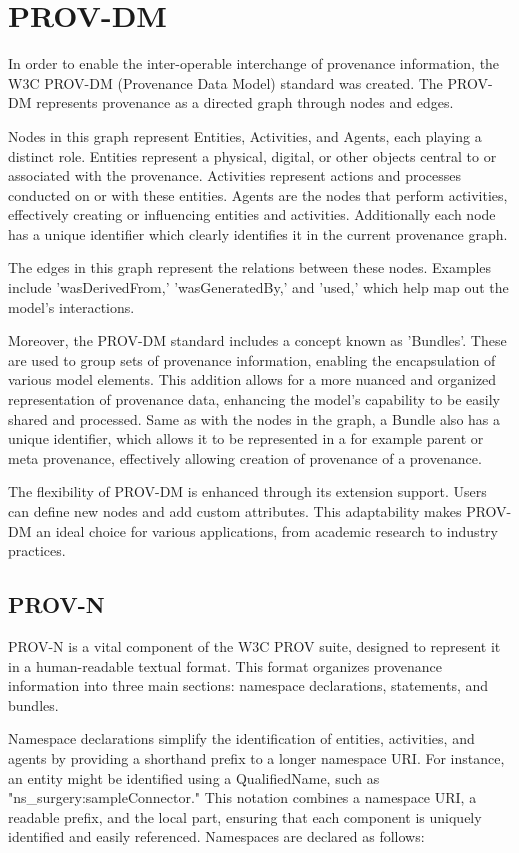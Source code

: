 \documentclass[
  digital,     %
  oneside,     %
  nosansbold,  %
  nocolorbold, %
  lof,         %
  lot,         %
]{fithesis4}
\begin{document}
\section{PROV-DM} \label{provdm}
\shorthandoff{-}
In order to enable the inter-operable interchange of provenance information, the W3C PROV-DM (Provenance Data Model) standard was created. The PROV-DM represents provenance as a directed graph through nodes and edges. 

Nodes in this graph represent Entities, Activities, and Agents, each playing a distinct role. Entities represent a physical, digital, or other objects central to or associated with the provenance. Activities represent actions and processes conducted on or with these entities. Agents are the nodes that perform activities, effectively creating or influencing entities and activities. Additionally each node has a unique identifier which clearly identifies it in the current provenance graph.

The edges in this graph represent the relations between these nodes. Examples include 'wasDerivedFrom,' 'wasGeneratedBy,' and 'used,' which help map out the model's interactions.

Moreover, the PROV-DM standard includes a concept known as 'Bundles'. These are used to group sets of provenance information, enabling the encapsulation of various model elements. This addition allows for a more nuanced and organized representation of provenance data, enhancing the model's capability to be easily shared and processed. Same as with the nodes in the graph, a Bundle also has a unique identifier, which allows it to be represented in a  for example parent or meta provenance, effectively allowing creation of provenance of a provenance.

The flexibility of PROV-DM is enhanced through its extension support. Users can define new nodes and add custom attributes. This adaptability makes PROV-DM an ideal choice for various applications, from academic research to industry practices.
\shorthandon{-}

\subsection{PROV-N}
\shorthandoff{-}
PROV-N is a vital component of the W3C PROV suite, designed to represent it in a human-readable textual format. This format organizes provenance information into three main sections: namespace declarations, statements, and bundles. 

Namespace declarations simplify the identification of entities, activities, and agents by providing a shorthand prefix to a longer namespace URI. For instance, an entity might be identified using a QualifiedName, such as "ns\_surgery:sampleConnector." This notation combines a namespace URI, a readable prefix, and the local part, ensuring that each component is uniquely identified and easily referenced. Namespaces are declared as follows:
\end{document}
